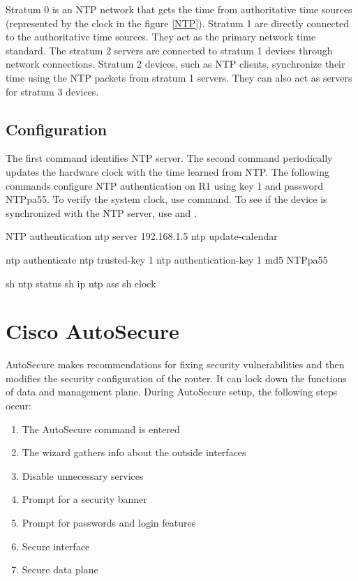 Stratum 0 is an NTP network that gets the time from authoritative time sources (represented by the clock in the figure \ref{NTP}). Stratum 1 are directly connected to the authoritative time sources. They act as the primary network time standard. The stratum 2 servers are connected to stratum 1 devices through network connections. Stratum 2 devices, such as NTP clients, synchronize their time using the NTP packets from stratum 1 servers. They can also act as servers for stratum 3 devices.

\subsection{Configuration}

The first command identifies NTP server.  The second command periodically updates the hardware clock with the time learned from NTP. The following commands configure NTP authentication on R1 using key 1 and password NTPpa55. To verify the system clock, use  command. To see if the device is synchronized with the NTP server, use  and .

\begin{sexylisting}{NTP authentication}
ntp server 192.168.1.5
ntp update-calendar

ntp authenticate
ntp trusted-key 1
ntp authentication-key 1 md5 NTPpa55

sh ntp status
sh ip ntp ass
sh clock
\end{sexylisting}

\section{Cisco AutoSecure}

AutoSecure makes recommendations for fixing security vulnerabilities and then modifies the security configuration of the router. It can lock down the functions of data and management plane. During AutoSecure setup, the following steps occur:

\begin{enumerate}
\item The AutoSecure command is entered
\item The wizard gathers info about the outside interfaces
\item Disable unnecessary services
\item Prompt for a security banner
\item Prompt for passwords and login features
\item Secure interface
\item Secure data plane
\end{enumerate}

